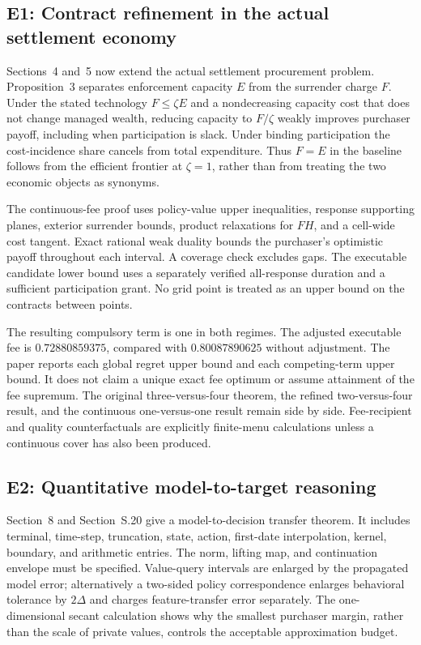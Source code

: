 \subsection{E1: Contract refinement in the actual settlement economy}
Sections~4 and~5 now extend the actual settlement procurement problem. Proposition~3 separates enforcement capacity $E$ from the surrender charge $F$. Under the stated technology $F\leq\zeta E$ and a nondecreasing capacity cost that does not change managed wealth, reducing capacity to $F/\zeta$ weakly improves purchaser payoff, including when participation is slack. Under binding participation the cost-incidence share cancels from total expenditure. Thus $F=E$ in the baseline follows from the efficient frontier at $\zeta=1$, rather than from treating the two economic objects as synonyms.

The continuous-fee proof uses policy-value upper inequalities, response supporting planes, exterior surrender bounds, product relaxations for $FH$, and a cell-wide cost tangent. Exact rational weak duality bounds the purchaser's optimistic payoff throughout each interval. A coverage check excludes gaps. The executable candidate lower bound uses a separately verified all-response duration and a sufficient participation grant. No grid point is treated as an upper bound on the contracts between points.

The resulting compulsory term is one in both regimes. The adjusted executable fee is $0.72880859375$, compared with $0.80087890625$ without adjustment. The paper reports each global regret upper bound and each competing-term upper bound. It does not claim a unique exact fee optimum or assume attainment of the fee supremum. The original three-versus-four theorem, the refined two-versus-four result, and the continuous one-versus-one result remain side by side. Fee-recipient and quality counterfactuals are explicitly finite-menu calculations unless a continuous cover has also been produced.

\subsection{E2: Quantitative model-to-target reasoning}
Section~8 and Section~S.20 give a model-to-decision transfer theorem. It includes terminal, time-step, truncation, state, action, first-date interpolation, kernel, boundary, and arithmetic entries. The norm, lifting map, and continuation envelope must be specified. Value-query intervals are enlarged by the propagated model error; alternatively a two-sided policy correspondence enlarges behavioral tolerance by $2\Delta$ and charges feature-transfer error separately. The one-dimensional secant calculation shows why the smallest purchaser margin, rather than the scale of private values, controls the acceptable approximation budget.

